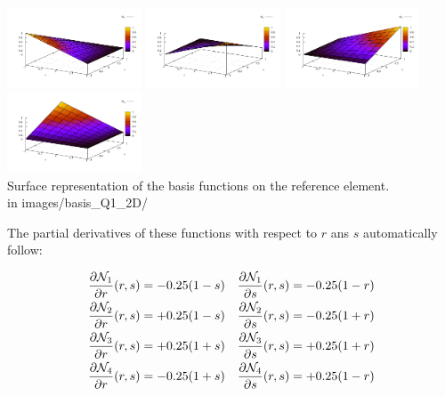 \begin{center}
\includegraphics[width=4cm]{images/basis_Q1_2D/N1}
\includegraphics[width=4cm]{images/basis_Q1_2D/N2}
\includegraphics[width=4cm]{images/basis_Q1_2D/N3}
\includegraphics[width=4cm]{images/basis_Q1_2D/N4}\\
{\captionfont Surface representation of the basis functions on the reference element.\\
{\color{gray} in images/basis\_Q1\_2D/ }}
\end{center}


The partial derivatives of these functions with respect to $r$ ans $s$ automatically follow:

\begin{mdframed}[backgroundcolor=blue!5]
\begin{align}
\frac{\partial {\mathcal{N}}_1}{\partial r}(r,s)&= - 0.25(1-s) &
\frac{\partial {\mathcal{N}}_1}{\partial s}(r,s)&= - 0.25(1-r) \nonumber\\
\frac{\partial {\mathcal{N}}_2}{\partial r}(r,s)&= + 0.25(1-s) &
\frac{\partial {\mathcal{N}}_2}{\partial s}(r,s)&= - 0.25(1+r) \nonumber\\
\frac{\partial {\mathcal{N}}_3}{\partial r}(r,s)&= + 0.25(1+s) &
\frac{\partial {\mathcal{N}}_3}{\partial s}(r,s)&= + 0.25(1+r) \nonumber\\
\frac{\partial {\mathcal{N}}_4}{\partial r}(r,s)&= - 0.25(1+s) &
\frac{\partial {\mathcal{N}}_4}{\partial s}(r,s)&= + 0.25(1-r) \nonumber
\end{align}
\end{mdframed}

